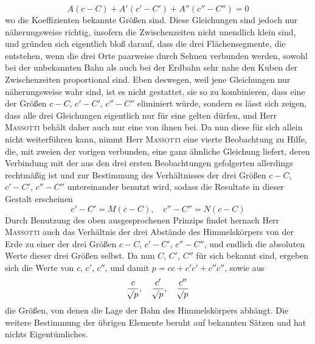 \[
A(c-C)+A'(c'-C')+A''(c''-C'') = 0
\]
wo die Koeffizienten bekannte Größen sind. Diese Gleichungen sind jedoch nur näherungsweise richtig, insofern die Zwischenzeiten nicht unendlich klein sind, und gründen sich eigentlich bloß darauf, dass die drei Flächensegmente, die entstehen, wenn die drei Orte paarweise durch Sehnen verbunden werden, sowohl bei der unbekannten Bahn als auch bei der Erdbahn sehr nahe den Kuben der Zwischenzeiten proportional sind. Eben deswegen, weil jene Gleichungen nur näherungsweise wahr sind, ist es nicht gestattet, sie so zu kombinieren, dass eine der Größen $c-C$, $c'-C'$, $c''-C''$ eliminiert würde, sondern es lässt sich zeigen, dass alle drei Gleichungen eigentlich nur für eine gelten dürfen, und Herr \textsc{Massotti} behält daher auch nur eine von ihnen bei. Da nun diese für sich allein nicht weiterführen kann, nimmt Herr \textsc{Massotti} eine vierte Beobachtung zu Hilfe, die, mit zweien der vorigen verbunden, eine ganz ähnliche Gleichung liefert, deren Verbindung mit der aus den drei ersten Beobachtungen gefolgerten allerdings rechtmäßig ist und zur Bestimmung des Verhältnisses der drei Größen $c-C$, $c'-C'$, $c''-C''$ untereinander benutzt wird, sodass die Resultate in dieser Gestalt erscheinen
\[
c'-C' = M(c-C), \quad c''-C'' = N(c-C)
\]
Durch Benutzung des oben ausgesprochenen Prinzips findet hernach Herr \textsc{Massotti} auch das Verhältnis der drei Abstände des Himmelskörpers von der Erde zu einer der drei Größen $c-C$, $c'-C'$, $c''-C''$, und endlich die absoluten Werte dieser drei Größen selbst. Da nun $C$, $C'$, $C''$ für sich bekannt sind, ergeben sich die Werte von $c$, $c'$, $c''$, und damit $p = cc+c'c'+c''c''$, sowie aus
\[
\frac{c}{\mathord{{}^{}\!\surd}p}, \quad \frac{c'}{\mathord{{}^{}\!\surd}p}, \quad \frac{c''}{\mathord{{}^{}\!\surd}p}
\]
die Größen, von denen die Lage der Bahn des Himmelskörpers abhängt. Die weitere Bestimmung der übrigen Elemente beruht auf bekannten Sätzen und hat nichts Eigentümliches.

